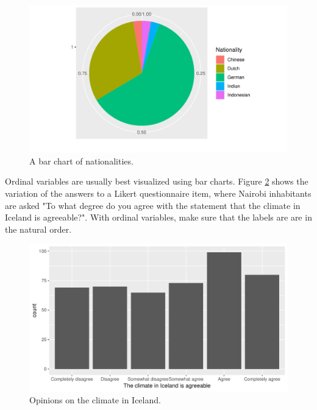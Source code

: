 \documentclass[]{book}\usepackage[]{graphicx}\usepackage[]{color}
\makeatletter
\def\maxwidth{ %
  \ifdim\Gin@nat@width>\linewidth
    \linewidth
  \else
    \Gin@nat@width
  \fi
}
\newenvironment{knitrout}{}{} %
\makeatother
\begin{document}
\begin{knitrout}
\color{fgcolor}\begin{figure}

{\centering \includegraphics[width=\maxwidth]{figure/nationality_3-1} 

}

\caption[A bar chart of nationalities]{A bar chart of nationalities.}\label{fig:nationality_3}
\end{figure}


\end{knitrout}


Ordinal variables are usually best visualized using bar charts. Figure \ref{fig:climate_1} shows the variation of the answers to a Likert questionnaire item, where Nairobi inhabitants are asked "To what degree do you agree with the statement that the climate in Iceland is agreeable?". With ordinal variables, make sure that the labels are are in the natural order. 

\begin{figure}

{\centering \includegraphics[width=\maxwidth]{figure/climate_1-1} 

}

\caption[Opinions on the climate in Iceland]{Opinions on the climate in Iceland.}\label{fig:climate_1}
\end{figure}
\end{document}
